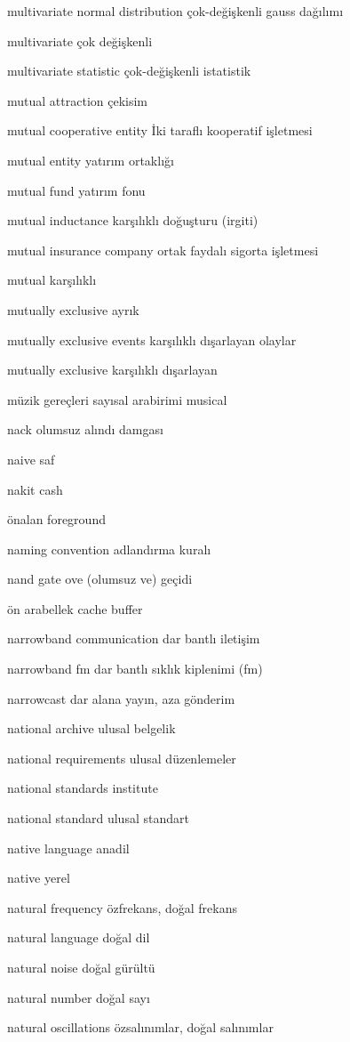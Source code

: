 \documentclass[12pt,fleqn]{article}\usepackage{../../common}
\begin{document}
multivariate normal distribution çok-değişkenli gauss dağılımı

multivariate çok değişkenli

multivariate statistic çok-değişkenli istatistik

mutual attraction çekisim

mutual cooperative entity İki taraflı kooperatif işletmesi

mutual entity yatırım ortaklığı

mutual fund yatırım fonu

mutual inductance karşılıklı doğuşturu (irgiti)

mutual insurance company ortak faydalı sigorta işletmesi

mutual karşılıklı

mutually exclusive ayrık

mutually exclusive events karşılıklı dışarlayan olaylar

mutually exclusive karşılıklı dışarlayan

müzik gereçleri sayısal arabirimi musical

nack olumsuz alındı damgası

naive saf

nakit cash

önalan foreground

naming convention adlandırma kuralı

nand gate ove (olumsuz ve) geçidi

ön arabellek cache buffer

narrowband communication dar bantlı iletişim

narrowband fm dar bantlı sıklık kiplenimi (fm)

narrowcast dar alana yayın, aza gönderim

national archive ulusal belgelik

national requirements ulusal düzenlemeler

national standards institute

national standard ulusal standart

native language anadil

native yerel

natural frequency özfrekans, doğal frekans

natural language doğal dil

natural noise doğal gürültü

natural number doğal sayı

natural oscillations özsalınımlar, doğal salınımlar
\end{document}
